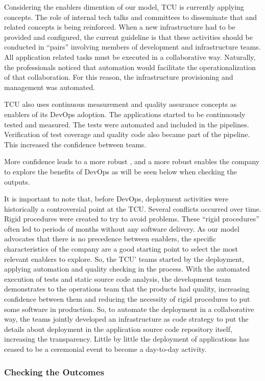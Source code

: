 Considering the enablers dimention of our model, TCU is currently
applying  concepts.
The role of internal tech talks and committees to disseminate that \cc
and related concepts is being reinforced. When a new infrastructure had
to be provided and configured, the current guideline is that these
activities should be conducted in ``pairs'' involving members of
development and infrastructure teams. All application related tasks must be executed in a collaborative
way. Naturally, the professionals noticed that automation would facilitate the
operationalization of that collaboration. For this reason, the infrastructure
provisioning and management was automated.

TCU also uses continuous measurement and quality assurance concepts as
enablers of its DevOps adoption. The applications started to be continuously
tested and measured. The tests were automated and included in the pipelines.
Verification of test coverage and quality code also became part of the pipeline.
This increased the confidence between teams. {\color{blue} More confidence leads to a more
robust \cc, and a more robust \cc enables the company to explore the benefits
of DevOps as will be seen below when checking the outputs.

It is important to note that, before DevOps, deployment activities were
historically a controversial point at the TCU. Several conflicts occurred over
time. Rigid procedures were created to try to avoid problems. These ``rigid
procedures'' often led to periods of months without any software delivery. As
our model advocates that there is no precedence between enablers, the specific
characteristics of the company are a good starting point to select the most
relevant enablers to explore. So, the TCU' teams started by the deployment,
applying automation and quality checking in the process. With the automated
execution of tests and static source code analysis, the development team
demonstrates to the operations team that the products had quality, increasing
confidence between them and reducing the necessity of rigid procedures to put
some software in production. So, to automate the deployment in a collaborative
way, the teams jointly developed an infrastructure as code strategy to put the
details about deployment in the application source code repository itself,
increasing the transparency. Little by little the deployment of applications has
ceased to be a ceremonial event to become a day-to-day activity.
}

\subsubsection{Checking the Outcomes}

